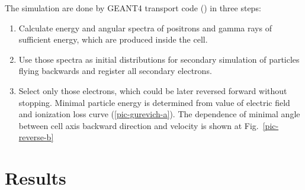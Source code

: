 \documentclass[utf8]{webofc}
\begin{document}
    The simulation are done by GEANT4 transport code (\cite{ALLISON2016186}) in three steps:
    
    \begin{enumerate}
        \item Calculate energy and angular spectra of positrons and gamma rays of sufficient energy, which are produced inside the cell.
        \item Use those spectra as initial distributions for secondary simulation of particles flying backwards and register all secondary electrons.
        \item Select only those electrons, which could be later reversed forward without stopping. Minimal particle energy is determined from value of electric field and ionization loss curve (\ref{pic-gurevich-a}). The dependence of minimal angle between cell axis backward direction and velocity is shown at Fig.~\ref{pic-reverse-b}
    \end{enumerate}
    
    
    
    \section{Results}
    
\end{document}
